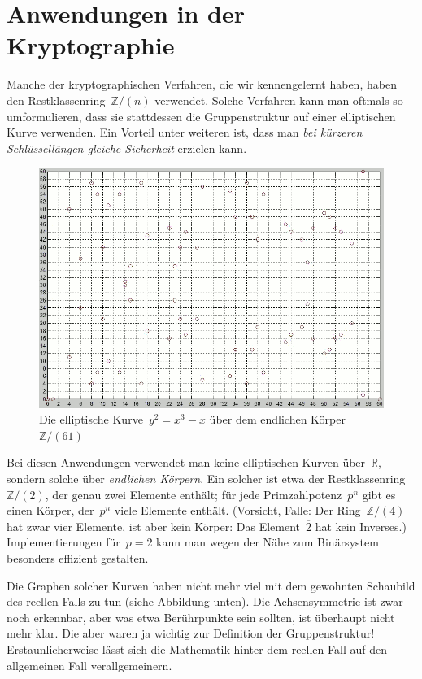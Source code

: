 \documentclass{../zirkelblatt}
\newcommand{\head}[1]{\section*{\rmfamily #1}}%
\newcommand{\ol}[1]{\ensuremath{\overline{#1}}}
\newcommand{\ZZ}{\mathbb{Z}}
\newcommand{\RR}{\mathbb{R}}
\begin{document}
\head{Anwendungen in der Kryptographie}

Manche der kryptographischen Verfahren, die wir kennengelernt haben, haben den
Restklassenring~$\ZZ/(n)$ verwendet. Solche Verfahren kann man oftmals so
umformulieren, dass sie stattdessen die Gruppenstruktur auf einer elliptischen
Kurve verwenden. Ein Vorteil unter weiteren ist, dass man \emph{bei kürzeren
Schlüssellängen gleiche Sicherheit} erzielen kann.

\begin{figure}[b!]
  \centering
  \includegraphics[scale=0.4]{elliptic-curve-z61}
  \caption{Die elliptische Kurve~$y^2 = x^3 - x$ über dem endlichen
  Körper~$\ZZ/(61)$}
\end{figure}

Bei diesen Anwendungen verwendet man keine elliptischen Kurven über~$\RR$,
sondern solche über \emph{endlichen Körpern}. Ein solcher ist etwa der
Restklassenring~$\ZZ/(2)$, der genau zwei Elemente enthält; für jede
Primzahlpotenz~$p^n$ gibt es einen Körper, der~$p^n$ viele
Elemente enthält. (Vorsicht, Falle: Der Ring~$\ZZ/(4)$ hat zwar vier
Elemente, ist aber kein Körper: Das Element~$\ol{2}$ hat kein Inverses.)
Implementierungen für~$p = 2$ kann man wegen der Nähe zum Binärsystem besonders
effizient gestalten.

Die Graphen solcher Kurven haben nicht mehr viel mit dem
gewohnten Schaubild des reellen Falls zu tun (siehe Abbildung unten). Die
Achsensymmetrie ist zwar noch erkennbar, aber was etwa Berührpunkte sein
sollten, ist überhaupt nicht mehr klar. Die aber waren ja wichtig zur
Definition der Gruppenstruktur! Erstaunlicherweise lässt sich die Mathematik
hinter dem reellen Fall auf den allgemeinen Fall verallgemeinern.
\end{document}
